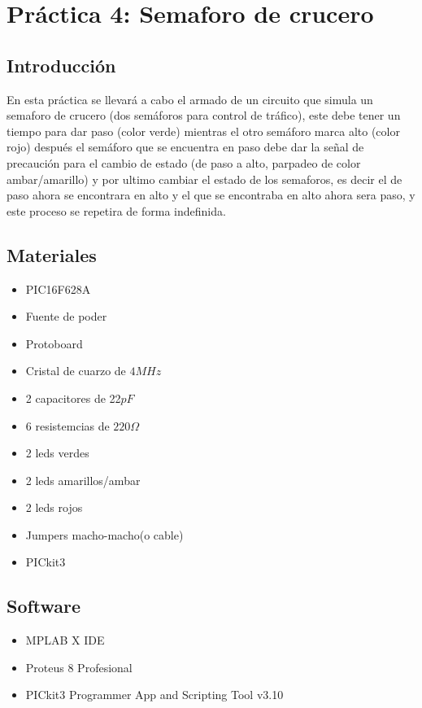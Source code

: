 \section{Pr\'actica 4: Semaforo de crucero}

\subsection{Introducci\'on}
\noindent
En esta práctica se llevará a cabo el armado de un circuito que simula un semaforo de crucero (dos semáforos para control de tráfico), este debe tener un tiempo para dar paso (color verde) mientras el otro semáforo marca alto (color rojo) después el semáforo que se encuentra en paso debe dar la señal de precaución para el cambio de estado (de paso a alto, parpadeo de color ambar/amarillo) y por ultimo cambiar el estado de los semaforos, es decir el de paso ahora se encontrara en alto y el que se encontraba en alto ahora sera paso, y este proceso se repetira de forma indefinida.

\subsection{Materiales}
\begin{itemize}
	\item PIC16F628A
	\item Fuente de poder
	\item Protoboard
	\item Cristal de cuarzo de $4MHz$
	\item 2 capacitores de 22$pF$
	\item 6 resistemcias de $220\Omega$
	\item 2 leds verdes
	\item 2 leds amarillos/ambar
	\item 2 leds rojos
	\item Jumpers macho-macho(o cable)
	\item PICkit3
\end{itemize}

\subsection{Software}
\begin{itemize}
	\item MPLAB X IDE
	\item Proteus 8 Profesional
	\item PICkit3 Programmer App and Scripting Tool v3.10
	\end{itemize}


